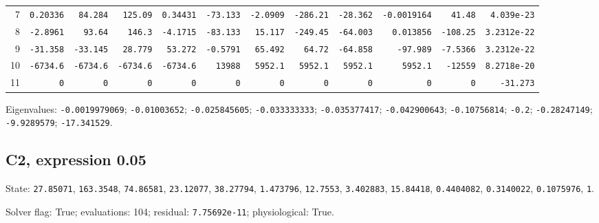 \begin{landscape}
\begin{tabular}{rrrrrrrrrrrr}
7 & \texttt{0.20336} & \texttt{84.284} & \texttt{125.09} & \texttt{0.34431} & \texttt{-73.133} & \texttt{-2.0909} & \texttt{-286.21} & \texttt{-28.362} & \texttt{-0.0019164} & \texttt{41.48} & \texttt{4.039e-23} \\

8 & \texttt{-2.8961} & \texttt{93.64} & \texttt{146.3} & \texttt{-4.1715} & \texttt{-83.133} & \texttt{15.117} & \texttt{-249.45} & \texttt{-64.003} & \texttt{0.013856} & \texttt{-108.25} & \texttt{3.2312e-22} \\

9 & \texttt{-31.358} & \texttt{-33.145} & \texttt{28.779} & \texttt{53.272} & \texttt{-0.5791} & \texttt{65.492} & \texttt{64.72} & \texttt{-64.858} & \texttt{-97.989} & \texttt{-7.5366} & \texttt{3.2312e-22} \\

10 & \texttt{-6734.6} & \texttt{-6734.6} & \texttt{-6734.6} & \texttt{-6734.6} & \texttt{13988} & \texttt{5952.1} & \texttt{5952.1} & \texttt{5952.1} & \texttt{5952.1} & \texttt{-12559} & \texttt{8.2718e-20} \\

11 & \texttt{0} & \texttt{0} & \texttt{0} & \texttt{0} & \texttt{0} & \texttt{0} & \texttt{0} & \texttt{0} & \texttt{0} & \texttt{0} & \texttt{-31.273} \\

\bottomrule\end{tabular}\par\endgroup

{\scriptsize Eigenvalues: \texttt{-0.0019979069}; \texttt{-0.01003652}; \texttt{-0.025845605}; \texttt{-0.033333333}; \texttt{-0.035377417}; \texttt{-0.042900643}; \texttt{-0.10756814}; \texttt{-0.2}; \texttt{-0.28247149}; \texttt{-9.9289579}; \texttt{-17.341529}.\par}

\clearpage
\subsection*{C2, expression 0.05}
{\scriptsize State: \texttt{27.85071}, \texttt{163.3548}, \texttt{74.86581}, \texttt{23.12077}, \texttt{38.27794}, \texttt{1.473796}, \texttt{12.7553}, \texttt{3.402883}, \texttt{15.84418}, \texttt{0.4404082}, \texttt{0.3140022}, \texttt{0.1075976}, \texttt{1}.\par

Solver flag: True; evaluations: 104; residual: \texttt{7.75692e-11}; physiological: True.\par}


\end{landscape}
